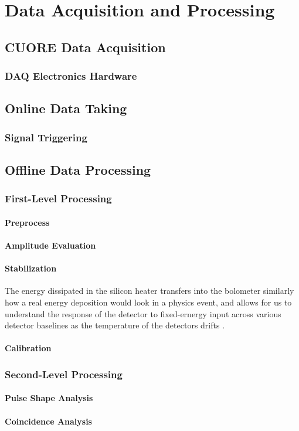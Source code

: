 \chapter{Data Acquisition and Processing}

\section{CUORE Data Acquisition}
\subsection{DAQ Electronics Hardware}

\section{Online Data Taking}
\subsection{Signal Triggering}

\section{Offline Data Processing}
\subsection{First-Level Processing}
\subsubsection{Preprocess}
\subsubsection{Amplitude Evaluation}
\subsubsection{Stabilization}
\label{ssec:Stabilization}

The energy dissipated in the silicon heater transfers into the bolometer similarly how a real energy deposition would look in a physics event, and allows for us to understand the response of the detector to fixed-ernergy input across various detector baselines as the temperature of the detectors drifts \cite{ALESSANDRELLO1998454:Si-heater}.

\subsubsection{Calibration}
\label{ssec:Calibration}
\subsection{Second-Level Processing}
\subsubsection{Pulse Shape Analysis}
\subsubsection{Coincidence Analysis}



